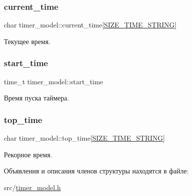 \subsubsection{\texorpdfstring{current\+\_\+time}{current\_time}}
{\footnotesize\ttfamily char timer\+\_\+model\+::current\+\_\+time\mbox{[}\hyperlink{timer__model_8h_afb8e0513b4926ca94b38be5d60aaf125}{S\+I\+Z\+E\+\_\+\+T\+I\+M\+E\+\_\+\+S\+T\+R\+I\+NG}\mbox{]}}



Текущее время. 

\mbox{\label{structtimer__model_aa78e974af2e5cde082a081c24c7fafc4}} 
\subsubsection{\texorpdfstring{start\+\_\+time}{start\_time}}
{\footnotesize\ttfamily time\+\_\+t timer\+\_\+model\+::start\+\_\+time}



Время пуска таймера. 

\mbox{\label{structtimer__model_a02202197b7b11c2d3dde956d875a4c02}} 
\subsubsection{\texorpdfstring{top\+\_\+time}{top\_time}}
{\footnotesize\ttfamily char timer\+\_\+model\+::top\+\_\+time\mbox{[}\hyperlink{timer__model_8h_afb8e0513b4926ca94b38be5d60aaf125}{S\+I\+Z\+E\+\_\+\+T\+I\+M\+E\+\_\+\+S\+T\+R\+I\+NG}\mbox{]}}



Рекорное время. 



Объявления и описания членов структуры находятся в файле\+:\begin{DoxyCompactItemize}
\item 
src/\hyperlink{timer__model_8h}{timer\+\_\+model.\+h}\end{DoxyCompactItemize}
